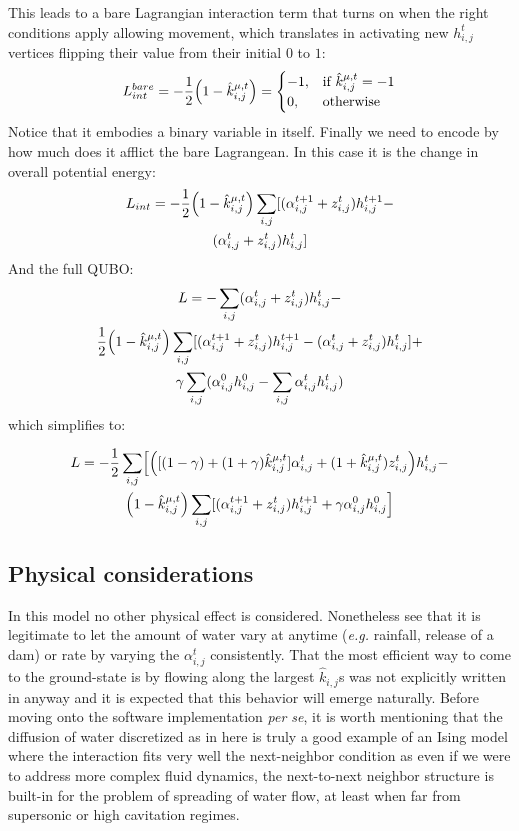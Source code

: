 \documentclass[%
 reprint,
 amsmath,amssymb,
 aps,
]{revtex4-2}
\begin{document}
This leads to a bare Lagrangian interaction term that turns on when the right conditions apply allowing movement, which translates in activating new $h_{i,j}^t$ vertices flipping their value from their initial $0$ to $1$:  
  \begin{equation}    
  L_{int}^{bare} = -\frac{1}{2}\Bigl(1-\hat{k}_{i,j}^{\mu,t}\Bigr)=\begin{cases}-1, & \text{if } \hat{k}_{i,j}^{\mu,t} = -1 \\0,  & \text{otherwise } 
\end{cases}
 \end{equation}
Notice that it embodies a binary variable in itself.
Finally we need to encode by how much does it afflict the bare Lagrangean. In this case it is the change in overall potential energy:
\begin{multline} 
  L_{int} = -\frac{1}{2}\Bigl(1-\hat{k}_{i,j}^{\mu,t}\Bigr)\sum_{i,j}[(\alpha_{i,j}^{t+1} + z_{i,j}^t)h_{i,j}^{t+1}-\\(\alpha_{i,j}^{t} + z_{i,j}^t)h_{i,j}^{t}]
\end{multline}
And the full QUBO:
\begin{multline}   
  L =  -  \sum_{i,j}(\alpha_{i,j}^t + z_{i,j}^t)h_{i,j}^t -\\\frac{1}{2}\Bigl(1-\hat{k}_{i,j}^{\mu,t}\Bigr)\sum_{i,j}[(\alpha_{i,j}^{t+1} + z_{i,j}^t)h_{i,j}^{t+1}-(\alpha_{i,j}^{t} + z_{i,j}^t)h_{i,j}^{t}] + \\\gamma \sum_{i,j} (\alpha_{i,j}^0h_{i,j}^0 - \sum_{i,j}\alpha_{i,j}^th_{i,j}^t)
\end{multline} 
which simplifies to:

\begin{multline} 
  L =  -  \frac{1}{2}\sum_{i,j}\Bigl[\Bigl([(1-\gamma) + (1+\gamma)\hat{k}_{i,j}^{\mu,t}]\alpha_{i,j}^t + (1+\hat{k}_{i,j}^{\mu,t})z_{i,j}^t\Bigr)h_{i,j}^t -\\\Bigl(1-\hat{k}_{i,j}^{\mu,t}\Bigr)\sum_{i,j}[(\alpha_{i,j}^{t+1} + z_{i,j}^t)h_{i,j}^{t+1} + \gamma \alpha_{i,j}^0h_{i,j}^0 \Bigr]
\end{multline}


\subsection{\label{sec:level3}Physical considerations}
In this model no other physical effect is considered. Nonetheless see that it is legitimate to let the amount of water vary at anytime (\textit{e.g.} rainfall, release of a dam) or rate by varying the $\alpha_{i,j}^t$ consistently. That the most efficient way to come to the ground-state is by flowing along the largest $\hat{k}_{i,j}$s was not explicitly written in anyway and it is expected that this behavior will emerge  naturally. Before moving onto the software implementation \textit{per se}, it is worth mentioning that the diffusion of water discretized as in here is truly a good example of an Ising model where the interaction fits very well the next-neighbor condition as even if we were to address more complex fluid dynamics, the next-to-next neighbor structure is built-in for the problem of spreading of water flow, at least when far from supersonic or high cavitation regimes.
\end{document}
